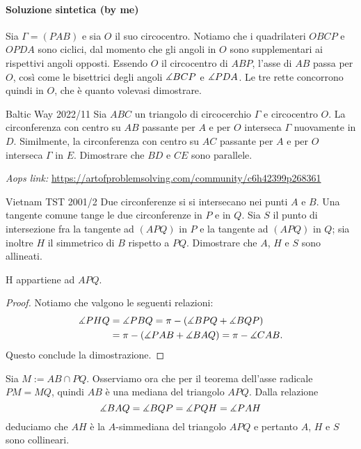 \documentclass{article}
\begin{document}
\paragraph{Soluzione sintetica (by me)}

Sia $\Gamma=(PAB)$ e sia $O$ il suo circocentro.
Notiamo che i quadrilateri $OBCP$ e $OPDA$ sono ciclici, dal momento
che gli angoli in $O$ sono supplementari ai rispettivi angoli opposti.
Essendo $O$ il circocentro di $ABP$, l'asse di $AB$ passa per $O$,
così come le bisettrici degli angoli $\measuredangle{BCP}$ e $\measuredangle{PDA}$.
Le tre rette concorrono quindi in $O$, che è quanto volevasi
dimostrare.

\begin{proposition}{Baltic Way 2022/11}{}
	Sia $ABC$ un triangolo di circocerchio $\Gamma$ e circocentro $O$.
	La circonferenza con centro su $AB$ passante per $A$ e per $O$
	interseca $\Gamma$ nuovamente in $D$. Similmente, la circonferenza
	con centro su $AC$ passante per $A$ e per $O$ interseca $\Gamma$ in $E$.
	Dimostrare che $BD$ e $CE$ sono parallele.
\end{proposition}

\vspace{0.5cm}
\textit{Aops link:}
\href{https://artofproblemsolving.com/community/c6h42399p268361}
{https://artofproblemsolving.com/community/c6h42399p268361}

\begin{proposition}{Vietnam TST 2001/2}{}
	Due circonferenze si si intersecano nei punti $A$ e $B$.
	Una tangente comune tange le due circonferenze in $P$ e in $Q$.
	Sia $S$ il punto di intersezione fra la tangente ad $(APQ)$ in $P$
	e la tangente ad $(APQ)$ in $Q$; sia inoltre $H$ il simmetrico di $B$
	rispetto a $PQ$. Dimostrare che $A$, $H$ e $S$ sono allineati.
\end{proposition}

\begin{claim*}{}{}
	H appartiene ad $APQ$.
\end{claim*}
\begin{proof}
	Notiamo che valgono le seguenti relazioni:
	\begin{align*}
		\measuredangle{PHQ}&=\measuredangle{PBQ}=\pi-(\measuredangle{BPQ}+\measuredangle{BQP}) \\
					 &=\pi-(\measuredangle{PAB}+\measuredangle{BAQ})=\pi-\measuredangle{CAB}.
	\end{align*}
	Questo conclude la dimostrazione.
\end{proof}
Sia $M:=AB\cap PQ$. Osserviamo ora che per il teorema
dell'asse radicale $PM=MQ$, quindi $AB$ è una mediana
del triangolo $APQ$. Dalla relazione
\begin{equation*}
	\measuredangle{BAQ}=\measuredangle{BQP}=\measuredangle{PQH}=\measuredangle{PAH}
\end{equation*}
deduciamo che $AH$ è la $A$-simmediana del triangolo $APQ$ e pertanto
$A$, $H$ e $S$ sono collineari.
\end{document}
